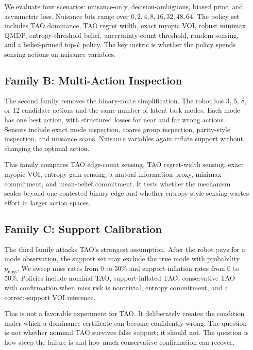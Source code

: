 \documentclass{article}
\begin{document}
We evaluate four scenarios: nuisance-only, decision-ambiguous, biased prior, and asymmetric loss. Nuisance bits range over $0,2,4,8,16,32,48,64$. The policy set includes TAO dominance, TAO regret width, exact myopic VOI, robust minimax, QMDP, entropy-threshold belief, uncertainty-count threshold, random sensing, and a belief-pruned top-$k$ policy. The key metric is whether the policy spends sensing actions on nuisance variables.

\subsection{Family B: Multi-Action Inspection}

The second family removes the binary-route simplification. The robot has 3, 5, 8, or 12 candidate actions and the same number of latent task modes. Each mode has one best action, with structured losses for near and far wrong actions. Sensors include exact mode inspection, coarse group inspection, parity-style inspection, and nuisance scans. Nuisance variables again inflate support without changing the optimal action.

This family compares TAO edge-count sensing, TAO regret-width sensing, exact myopic VOI, entropy-gain sensing, a mutual-information proxy, minimax commitment, and mean-belief commitment. It tests whether the mechanism scales beyond one contested binary edge and whether entropy-style sensing wastes effort in larger action spaces.

\subsection{Family C: Support Calibration}

The third family attacks TAO's strongest assumption. After the robot pays for a mode observation, the support set may exclude the true mode with probability $p_{\mathrm{miss}}$. We sweep miss rates from 0 to 30\% and support-inflation rates from 0 to 50\%. Policies include nominal TAO, support-inflated TAO, conservative TAO with confirmation when miss risk is nontrivial, entropy commitment, and a correct-support VOI reference.

This is not a favorable experiment for TAO. It deliberately creates the condition under which a dominance certificate can become confidently wrong. The question is not whether nominal TAO survives false support; it should not. The question is how steep the failure is and how much conservative confirmation can recover.
\end{document}
